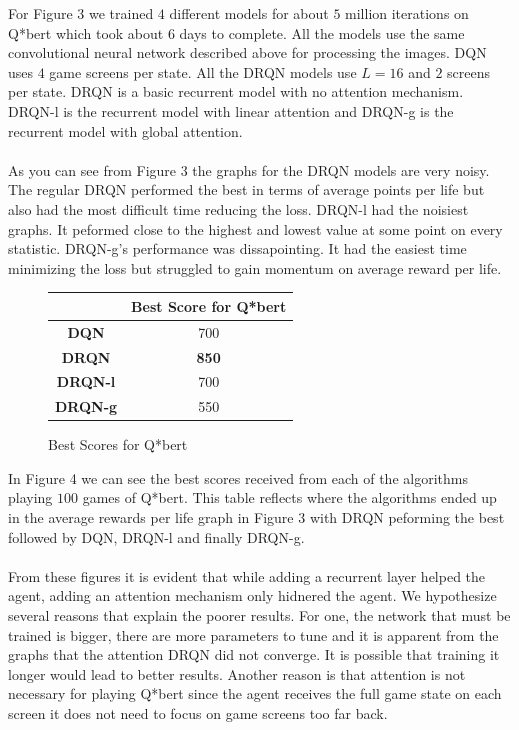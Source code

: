 \documentclass{article}
\begin{document}
For Figure 3 we trained $4$ different models for about $5$ million iterations on
Q*bert which took about $6$ days to complete. All the models use the same
convolutional neural network described above for processing the images. DQN uses
$4$ game screens per state. All the DRQN models use $L=16$ and $2$ screens per
state. DRQN is a basic recurrent model with no attention mechanism. DRQN-l is the
recurrent model with linear attention and DRQN-g is the recurrent model with
global attention. \\
\\
As you can see from Figure 3 the graphs for the DRQN models are very noisy. The
regular DRQN performed the best in terms of average points per life but also had
the most difficult time reducing the loss. DRQN-l had the noisiest graphs. It
peformed close to the highest and lowest value at some point on every statistic.
DRQN-g's performance was dissapointing. It had the easiest time minimizing the loss
but struggled to gain momentum on average reward per life. \\

\begin{figure}[h]
    \begin{center}
        \begin{tabular}{| c | c |}
            \hline
            & \textbf{Best Score for Q*bert} \\ \hline
            \textbf{DQN} & 700 \\ \hline
            \textbf{DRQN} & \textbf{850} \\ \hline
            \textbf{DRQN-l} & 700 \\ \hline
            \textbf{DRQN-g} & 550 \\ \hline
        \end{tabular}
    \end{center}
    \caption{Best Scores for Q*bert}
\end{figure}

In Figure 4 we can see the best scores received from each of the algorithms playing
$100$ games of Q*bert. This table reflects where the algorithms ended up in the
average rewards per life graph in Figure 3 with DRQN peforming the best followed
by DQN, DRQN-l and finally DRQN-g. \\
\\
From these figures it is evident that while adding a recurrent layer helped the
agent, adding an attention mechanism only hidnered the agent. We hypothesize
several reasons that explain the poorer results. For one, the network that must
be trained is bigger, there are more parameters to tune and it is apparent from
the graphs that the attention DRQN did not converge. It is possible that training
it longer would lead to better results. Another reason is that attention is not
necessary for playing Q*bert since the agent receives the full game state on each
screen it does not need to focus on game screens too far back.
\end{document}
